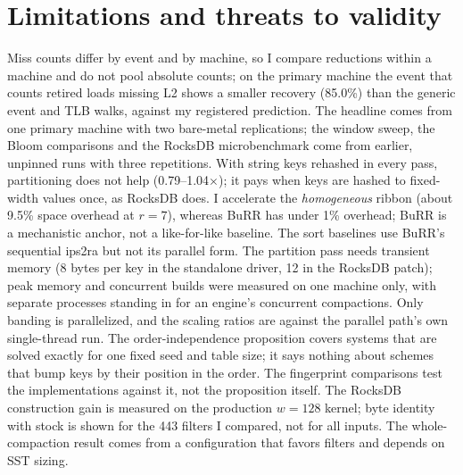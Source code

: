\documentclass[a4paper,UKenglish,cleveref,autoref,thm-restate,anonymous]{lipics-v2021}
\begin{document}
\section{Limitations and threats to validity}\label{sec:limits}
Miss counts differ by event and by machine, so I compare reductions within a machine and do not pool absolute counts; on the primary machine the event that counts retired loads missing L2 shows a smaller recovery (85.0\%) than the generic event and TLB walks, against my registered prediction. The headline comes from one primary machine with two bare-metal replications; the window sweep, the Bloom comparisons and the RocksDB microbenchmark come from earlier, unpinned runs with three repetitions. With string keys rehashed in every pass, partitioning does not help (0.79--1.04$\times$); it pays when keys are hashed to fixed-width values once, as RocksDB does. I accelerate the \emph{homogeneous} ribbon (about 9.5\% space overhead at $r=7$), whereas BuRR has under 1\% overhead; BuRR is a mechanistic anchor, not a like-for-like baseline. The sort baselines use BuRR's sequential ips2ra but not its parallel form. The partition pass needs transient memory (8 bytes per key in the standalone driver, 12 in the RocksDB patch); peak memory and concurrent builds were measured on one machine only, with separate processes standing in for an engine's concurrent compactions. Only banding is parallelized, and the scaling ratios are against the parallel path's own single-thread run. The order-independence proposition covers systems that are solved exactly for one fixed seed and table size; it says nothing about schemes that bump keys by their position in the order. The fingerprint comparisons test the implementations against it, not the proposition itself. The RocksDB construction gain is measured on the production $w=128$ kernel; byte identity with stock is shown for the 443 filters I compared, not for all inputs. The whole-compaction result comes from a configuration that favors filters and depends on SST sizing.
\end{document}
